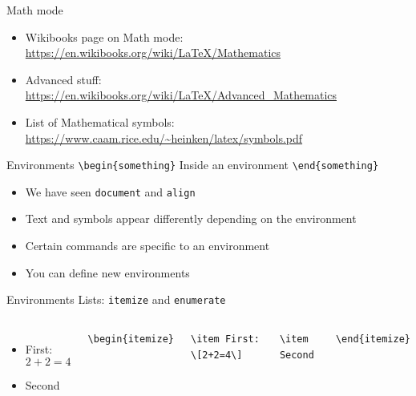 \documentclass[11pt]{beamer}
\newcommand{\bs}{\textbackslash}
\begin{document}
\begin{frame}{Math mode}
  \begin{itemize}
    \item Wikibooks page on Math mode:
         {\small\url{https://en.wikibooks.org/wiki/LaTeX/Mathematics}}
    \item Advanced stuff:
         {\small\url{https://en.wikibooks.org/wiki/LaTeX/Advanced_Mathematics}}
    \item List of Mathematical symbols:
         {\small\url{https://www.caam.rice.edu/~heinken/latex/symbols.pdf}}
  \end{itemize}
\end{frame}

\begin{frame}{Environments}
  \texttt{\color{red}\bs begin\{something\}}
    Inside an environment 
  \texttt{\color{red}\bs end\{something\}}

  \vspace{0.8cm}
  \begin{itemize}
    \item We have seen \texttt{document} and \texttt{align}
    \item Text and symbols appear differently depending on the environment
    \item Certain commands are specific to an environment
    \item You can define new environments
  \end{itemize}
\end{frame}


\begin{frame}{Environments}
  Lists: \texttt{\color{red}itemize} and \texttt{\color{red}enumerate}

  \vspace{0.8cm}
  \begin{columns}
      \begin{itemize}
        \item First: \[2+2=4\]
        \item Second
      \end{itemize}

      \texttt{\bs begin\{itemize\}}

      \texttt{\qquad \bs item First: \bs[2+2=4\bs]}

      \texttt{\qquad \bs item Second}

      \texttt{\bs end\{itemize\}}
  \end{columns}
\end{frame}
\end{document}
